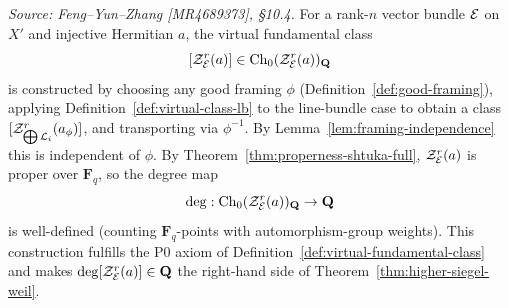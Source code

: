 \begin{definition}
  \label{def:virtual-class-full}
  \textit{Source: Feng--Yun--Zhang [MR4689373], \S10.4.}
  For a rank-\(n\) vector bundle \(\mathcal{E}\) on \(X'\) and injective Hermitian \(a\),
  the virtual fundamental class
  \[
    [\mathcal{Z}_{\mathcal{E}}^r(a)] \in \operatorname{Ch}_0(\mathcal{Z}_{\mathcal{E}}^r(a))_{\mathbf{Q}}
  \]
  is constructed by choosing any good framing \(\phi\) (Definition~\ref{def:good-framing}),
  applying Definition~\ref{def:virtual-class-lb} to the line-bundle case to obtain a class
  \([\mathcal{Z}_{\bigoplus \mathcal{L}_i}^r(a_\phi)]\), and transporting via \(\phi^{-1}\). By
  Lemma~\ref{lem:framing-independence} this is independent of \(\phi\). By
  Theorem~\ref{thm:properness-shtuka-full}, \(\mathcal{Z}_{\mathcal{E}}^r(a)\) is proper over
  \(\mathbf{F}_q\), so the degree map
  \[
    \deg : \operatorname{Ch}_0(\mathcal{Z}_{\mathcal{E}}^r(a))_{\mathbf{Q}} \to \mathbf{Q}
  \]
  is well-defined (counting \(\mathbf{F}_q\)-points with automorphism-group weights).
  This construction fulfills the P0 axiom of Definition~\ref{def:virtual-fundamental-class}
  and makes \(\deg[\mathcal{Z}_{\mathcal{E}}^r(a)] \in \mathbf{Q}\) the right-hand side of
  Theorem~\ref{thm:higher-siegel-weil}.
\end{definition}
